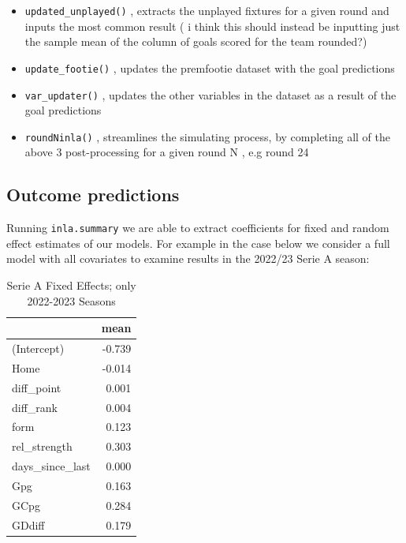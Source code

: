\documentclass[
]{article}
\begin{document}
\begin{itemize}
\item
  \texttt{updated\_unplayed()} , extracts the unplayed fixtures for a
  given round and inputs the most common result ( i think this should
  instead be inputting just the sample mean of the column of goals
  scored for the team rounded?)
\item
  \texttt{update\_footie()} , updates the premfootie dataset with the
  goal predictions
\item
  \texttt{var\_updater()} , updates the other variables in the dataset
  as a result of the goal predictions
\item
  \texttt{roundNinla()} , streamlines the simulating process, by
  completing all of the above 3 post-processing for a given round N ,
  e.g round 24
\end{itemize}

\hypertarget{outcome-predictions}{%
\subsection{Outcome predictions}\label{outcome-predictions}}

Running \texttt{inla.summary} we are able to extract coefficients for
fixed and random effect estimates of our models. For example in the case
below we consider a full model with all covariates to examine results in
the 2022/23 Serie A season:

\begin{table}

\caption{\label{tab:exampleseriesummaryoutput}Serie A Fixed Effects; only 2022-2023 Seasons}
\centering
\begin{tabular}[t]{l|r}
\hline
  & mean\\
\hline
(Intercept) & -0.739\\
\hline
Home & -0.014\\
\hline
diff\_point & 0.001\\
\hline
diff\_rank & 0.004\\
\hline
form & 0.123\\
\hline
rel\_strength & 0.303\\
\hline
days\_since\_last & 0.000\\
\hline
Gpg & 0.163\\
\hline
GCpg & 0.284\\
\hline
GDdiff & 0.179\\
\hline
\end{tabular}
\end{table}
\end{document}
